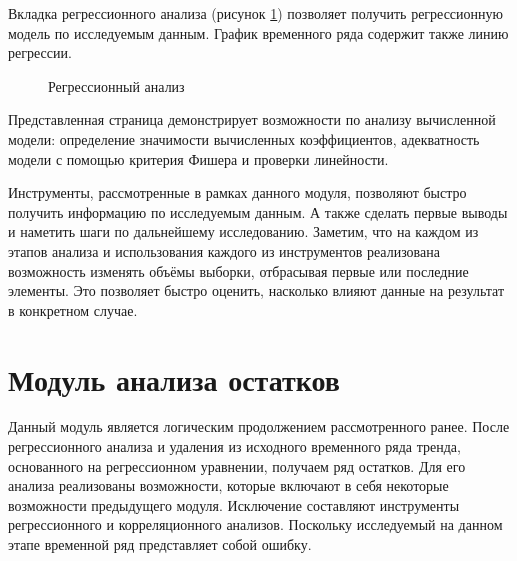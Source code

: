 Вкладка регрессионного анализа (рисунок \ref{img:mod_regr}) позволяет получить регрессионную модель по исследуемым данным. График временного ряда содержит также линию регрессии.
\begin{figure}[ht]
\caption{Регрессионный анализ}
\label{img:mod_regr}
\end{figure}
Представленная страница демонстрирует возможности по анализу вычисленной модели: определение значимости вычисленных коэффициентов, адекватность модели с помощью критерия Фишера и проверки линейности.

Инструменты, рассмотренные в рамках данного модуля, позволяют быстро получить информацию по исследуемым данным. А также сделать первые выводы и наметить шаги по дальнейшему исследованию. Заметим, что на каждом из этапов анализа и использования каждого из инструментов реализована возможность изменять объёмы выборки, отбрасывая первые или последние элементы. Это позволяет быстро оценить, насколько влияют данные на результат в конкретном случае.


\section{Модуль анализа остатков} %
\label{sec:mod_residuals}

Данный модуль является логическим продолжением рассмотренного ранее. После регрессионного анализа и удаления из исходного временного ряда тренда, основанного на регрессионном уравнении, получаем ряд остатков. Для его анализа реализованы возможности, которые включают в себя некоторые возможности предыдущего модуля. Исключение составляют инструменты регрессионного и корреляционного анализов. Поскольку исследуемый на данном этапе временной ряд представляет собой ошибку.

